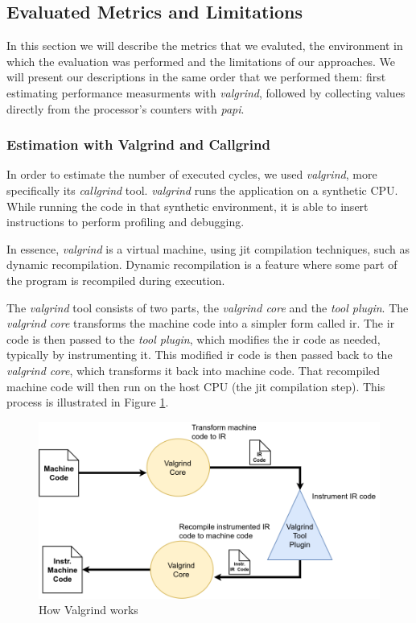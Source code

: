 \subsection{Evaluated Metrics and Limitations} \label{sec:eval-metrics-and-lims}

In this section we will describe the metrics that we evaluted, the environment in which the evaluation
was performed and the limitations of our approaches. We will present our descriptions in the same order
that we performed them: first estimating performance measurments with \textit{valgrind}, followed
by collecting values directly from the processor's counters with \textit{papi}.

\subsubsection{Estimation with Valgrind and Callgrind}

In order to estimate the number of executed cycles, we used \textit{valgrind}, more specifically
    its \textit{callgrind} tool. \textit{valgrind} runs the application on a synthetic CPU.
While running the code in that synthetic environment, it is able to insert instructions to perform
profiling and debugging.

In essence, \textit{valgrind} is a virtual machine, using \gls{jit}
compilation techniques, such as dynamic recompilation. Dynamic recompilation is a
feature where some part of the program is recompiled during execution.

The \textit{valgrind} tool consists of two parts, the \textit{valgrind core} and the \textit{tool
plugin}. The \textit{valgrind core} transforms the machine code into a simpler form called
\gls{ir}. The \gls{ir} code is then passed to the \textit{tool plugin}, which modifies the
\gls{ir} code as needed, typically by instrumenting it. This modified \gls{ir} code is then passed back to the
\textit{valgrind core}, which transforms it back into machine code. That recompiled machine code  will then run on the
host CPU (the \gls{jit} compilation step). This process is illustrated in Figure \ref{fig:how_valgrind_works}.

\begin{figure}
  \centering
  \includegraphics[width=1.0\textwidth]{img/how_valgrind_works.png}
  \centering \caption{\label{fig:how_valgrind_works} How Valgrind works}
\end{figure}

